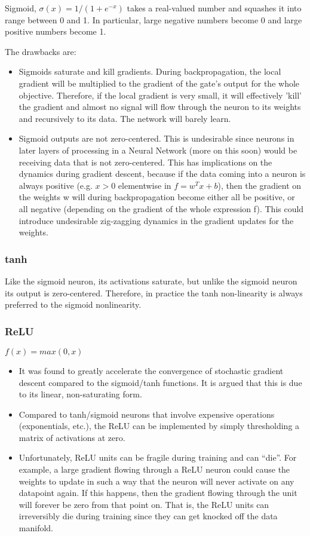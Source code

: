 \documentclass[letterpaper]{article}
\begin{document}
Sigmoid, \(\sigma(x) = 1/(1 + e^{-x})\) takes a real-valued number and squashes it into range between 0 and 1. In particular, large negative numbers become 0 and large positive numbers become 1. 

The drawbacks are:

\begin{itemize}
	\item Sigmoids saturate and kill gradients. During backpropagation, the local gradient will be multiplied to the gradient of the gate’s output for the whole objective. Therefore, if the local gradient is very small, it will effectively 'kill' the gradient and almost no signal will flow through the neuron to its weights and recursively to its data. The network will barely learn.
	\item Sigmoid outputs are not zero-centered. This is undesirable since neurons in later layers of processing in a Neural Network (more on this soon) would be receiving data that is not zero-centered. This has implications on the dynamics during gradient descent, because if the data coming into a neuron is always positive (e.g. \(x > 0 \) elementwise in \(f=w^Tx+b\)), then the gradient on the weights w will during backpropagation become either all be positive, or all negative (depending on the gradient of the whole expression f). This could introduce undesirable zig-zagging dynamics in the gradient updates for the weights.
\end{itemize}

\subsubsection{tanh}

Like the sigmoid neuron, its activations saturate, but unlike the sigmoid neuron its output is zero-centered. Therefore, in practice the tanh non-linearity is always preferred to the sigmoid nonlinearity. 

\subsubsection{ReLU}

\(f(x) = max(0, x)\)

\begin{itemize}
	\item It was found to greatly accelerate the convergence of stochastic gradient descent compared to the sigmoid/tanh functions. It is argued that this is due to its linear, non-saturating form.
	\item Compared to tanh/sigmoid neurons that involve expensive operations (exponentials, etc.), the ReLU can be implemented by simply thresholding a matrix of activations at zero.
	\item Unfortunately, ReLU units can be fragile during training and can “die”. For example, a large gradient flowing through a ReLU neuron could cause the weights to update in such a way that the neuron will never activate on any datapoint again. If this happens, then the gradient flowing through the unit will forever be zero from that point on. That is, the ReLU units can irreversibly die during training since they can get knocked off the data manifold. 
\end{itemize}
\end{document}
